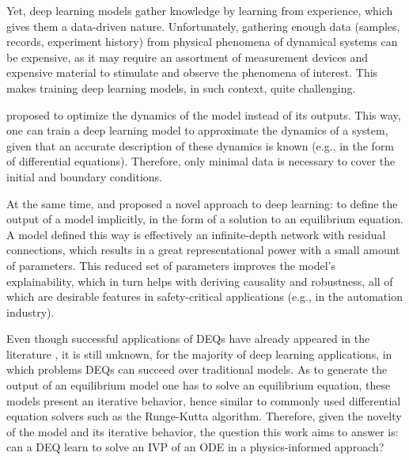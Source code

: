 Yet, deep learning models gather knowledge by learning from experience, which gives them a data-driven nature.
Unfortunately, gathering enough data (samples, records, experiment history) from physical phenomena of dynamical systems can be expensive, as it may require an assortment of measurement devices and expensive material to stimulate and observe the phenomena of interest.
This makes training deep learning models, in such context, quite challenging.

\textcite{Raissi2019} proposed to optimize the dynamics of the model instead of its outputs.
This way, one can train a deep learning model to approximate the dynamics of a system, given that an accurate description of these dynamics is known (e.g., in the form of differential equations).
Therefore, only minimal data is necessary to cover the initial and boundary conditions.

At the same time, \textcite{Bai2019} and \textcite{Ghaoui2019} proposed a novel approach to deep learning: to define the output of a model implicitly, in the form of a solution to an equilibrium equation.
A model defined this way is effectively an infinite-depth network \cite{Bai2019} with residual connections\cite{he_deep_2016}, which results in a great representational power with a small amount of parameters.
This reduced set of parameters improves the model's explainability, which in turn helps with deriving causality and robustness, all of which are desirable features in safety-critical applications (e.g., in the automation industry).

Even though successful applications of \gls{DEQ}s have already appeared in the literature \cite{bai_multiscale_2020}, it is still unknown, for the majority of deep learning applications, in which problems \gls{DEQ}s can succeed over traditional models.
As to generate the output of an equilibrium model one has to solve an equilibrium equation, these models present an iterative behavior, hence similar to commonly used differential equation solvers such as the Runge-Kutta algorithm.
Therefore, given the novelty of the model and its iterative behavior, the question this work aims to answer is: can a \gls{DEQ} learn to solve an \gls{IVP} of an \gls{ODE} in a physics-informed approach?



